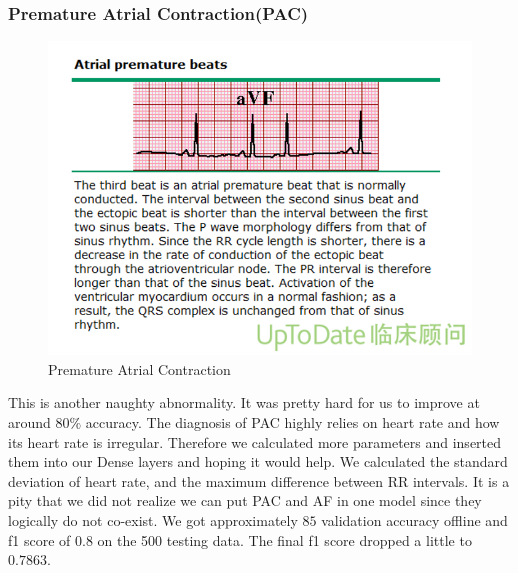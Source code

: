 \documentclass[%
 reprint,
 amsmath,amssymb,
 aps,
]{revtex4-2}
\begin{document}
\subsubsection{Premature Atrial Contraction(PAC)}
\begin{figure}[H]
	\includegraphics[width=\linewidth]{img/PAC.png}
	\caption{\label{fig:PAC} Premature Atrial Contraction \cite{UptoDate}}
\end{figure}
This is another naughty abnormality. It was pretty hard for us to improve at around $80\%$ accuracy. The diagnosis of PAC highly relies on heart rate and how its heart rate is irregular. Therefore we calculated more parameters and inserted them into our Dense layers and hoping it would help. We calculated the standard deviation of heart rate, and the maximum difference between RR intervals. 
It is a pity that we did not realize we can put PAC and AF in one model since they logically do not co-exist. 
We got approximately $85$ validation accuracy offline and f1 score of $0.8$ on the 500 testing data. The final f1 score dropped a little to $0.7863$.
\end{document}
